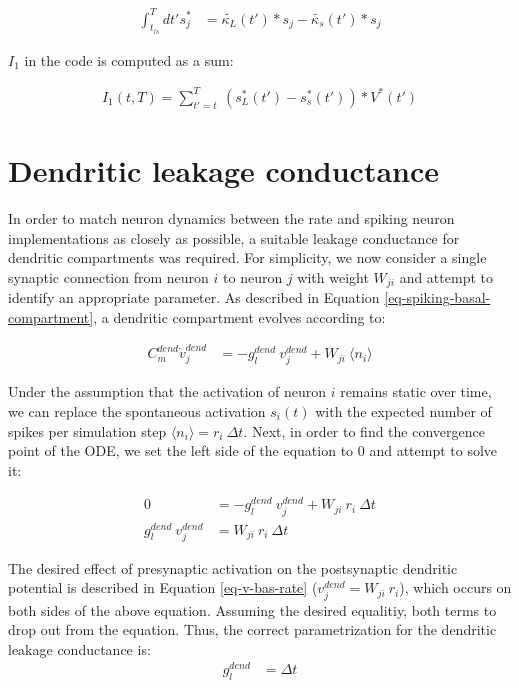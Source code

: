 \begin{align}
  \int_{t_{ls}}^T dt' s_j^* & =  \tilde{\kappa_L}(t') * s_j -  \tilde{\kappa_s}(t') * s_j
\end{align}

$I_1$ in the code is computed as a sum:

\begin{align}
  I_1 (t,T) = \sum_{t'=t}^T \ (s_L^*(t') - s_s^*(t')) * V^*(t')
\end{align}



\section{Dendritic leakage conductance}\label{sec-gl-dend}

In order to match neuron dynamics between the rate and spiking neuron implementations as closely as possible, a suitable
leakage conductance for dendritic compartments was required. For simplicity, we now consider a single synaptic
connection from neuron $i$ to neuron $j$ with weight $W_{ji}$ and attempt to identify an appropriate parameter. As
described in Equation \ref{eq-spiking-basal-compartment}, a dendritic compartment evolves according to: 

\begin{align}
    C_m^{dend} \dot{v}_j^{dend} & = -g_l^{dend} \  v_j^{dend} +  W_{ji} \    \langle \textit{n}_i \rangle
\end{align}

Under the assumption that the activation of neuron $i$ remains static over time, we can replace the spontaneous
activation $s_i(t)$ with the expected number of spikes per simulation step $\langle \textit{n}_i \rangle = r_i \ \Delta
    t$. Next, in order to find the convergence point of the ODE, we set the left side of the equation to $0$ and attempt to
solve it:

\begin{align}
    0                        & = -g_l^{dend} \  v_j^{dend} + W_{ji} \    r_i \ \Delta t \\
    g_l^{dend} \  v_j^{dend} & = W_{ji} \    r_i \ \Delta t
\end{align}

The desired effect of presynaptic activation on the postsynaptic dendritic potential is described in Equation
\ref{eq-v-bas-rate} ($v_j^{dend} = W_{ji} \    r_i$), which occurs on both sides of the above equation. Assuming the
desired equalitiy, both terms to drop out from the equation. Thus, the correct parametrization for the dendritic leakage
conductance is:
\begin{align}
    g_l^{dend} & = \Delta t
\end{align}

